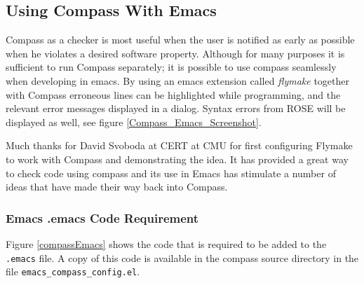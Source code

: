 \subsection{Using Compass With Emacs}

\label{compass::emacs}

Compass as a checker is most useful when the user is notified as early as possible
when he violates a desired software property. Although for many purposes it is
sufficient to run Compass separately; it is possible to use compass
seamlessly when developing in emacs. By using an emacs extension called {\em flymake} together
with Compass erroneous lines can be highlighted while programming, and the relevant error messages displayed 
in a dialog. Syntax errors from ROSE will be displayed as well, see figure \ref{Compass_Emacs_Screenshot}.

Much thanks for David Svoboda at CERT at CMU for first configuring Flymake to work with
Compass and demonstrating the idea.  It has provided a great way to check code using
compass and its use in Emacs has stimulate a number of ideas that have made their way
back into Compass.

\subsubsection{Emacs .emacs Code Requirement}

   Figure \ref{compassEmacs} shows the code that is required to be added to the {\tt .emacs}
file.  A copy of this code is available in the compass source directory in the file
{\tt emacs\_compass\_config.el}.

